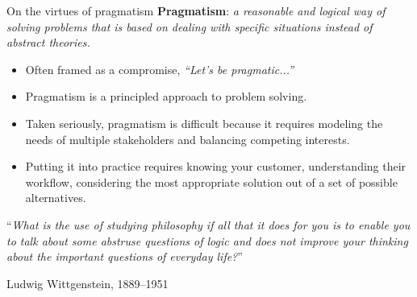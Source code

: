 \documentclass{beamer}
\begin{document}
\begin{frame}[fragile]{On the virtues of pragmatism}
  \textbf{Pragmatism}: \textit{a reasonable and logical way of solving problems that is based on dealing with specific situations instead of abstract theories.}\newline\\
  \begin{itemize}
    \item Often framed as a compromise, \textit{``Let's be pragmatic...''}
    \item Pragmatism is a principled approach to problem solving.
    \item Taken seriously, pragmatism is difficult because it requires modeling the needs of multiple stakeholders and balancing competing interests.
    \item Putting it into practice requires knowing your customer, understanding their workflow, considering the most appropriate solution out of a set of possible alternatives.
  \end{itemize}
    \setlength{\epigraphwidth}{0.97\textwidth}
    \epigraph{``\textit{What is the use of studying philosophy if all that it does for you is to enable you to talk about some abstruse questions of logic and does not improve your thinking about the important questions of everyday life?}''}{Ludwig Wittgenstein, 1889–1951}
\end{frame}
\end{document}
